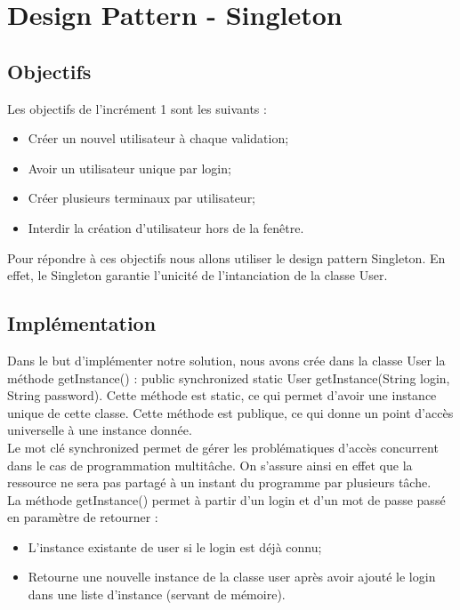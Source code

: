 
\newpage
\section{Design Pattern - Singleton}

	\subsection{Objectifs}

	Les objectifs de l'incrément 1 sont les suivants :\\

	\begin{itemize}
	\item Créer un nouvel utilisateur à chaque validation;
	\item Avoir un utilisateur unique par login;
	\item Créer plusieurs terminaux par utilisateur;
	\item Interdir la création d'utilisateur hors de la fenêtre.\\
	\end{itemize}

	Pour répondre à ces objectifs nous allons utiliser le design pattern Singleton. En effet, le Singleton garantie l'unicité de l'intanciation de la classe User.

	\subsection{Implémentation}

Dans le but d'implémenter notre solution, nous avons crée dans la classe User la méthode getInstance() :
public synchronized  static User getInstance(String login, String password). Cette méthode est static, ce qui permet d'avoir une instance unique de cette classe. Cette méthode est publique, ce qui donne un point d'accès universelle à une instance donnée.\\
Le mot clé synchronized permet de gérer les problématiques d'accès concurrent dans le cas de programmation multitâche. On s'assure ainsi en effet que la ressource ne sera pas partagé à un instant du programme par plusieurs tâche.\\

La méthode getInstance() permet à partir d'un login et d'un mot de passe passé en paramètre de retourner : \\
\begin{itemize}
\item L'instance existante de user si le login est déjà connu;
\item Retourne une nouvelle instance de la classe user après avoir ajouté le login dans une liste d'instance (servant de mémoire).
\end{itemize}
